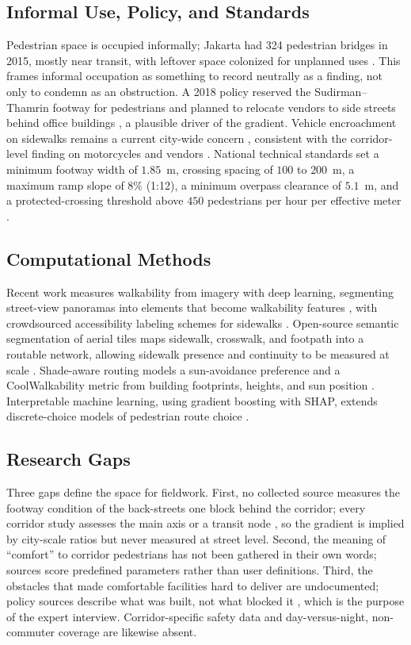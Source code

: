 \documentclass[conference]{IEEEtran}
\begin{document}
\subsection{Informal Use, Policy, and Standards}
Pedestrian space is occupied informally; Jakarta had 324 pedestrian bridges in 2015, mostly near
transit, with leftover space colonized for unplanned uses \autocite{putri2020residual}. This frames
informal occupation as something to record neutrally as a finding, not only to condemn as an
obstruction. A 2018 policy reserved the Sudirman--Thamrin footway for pedestrians and planned to
relocate vendors to side streets behind office buildings \autocite{merdeka2018pkl}, a plausible
driver of the gradient. Vehicle encroachment on sidewalks remains a current city-wide concern
\autocite{kompas2026trotoar}, consistent with the corridor-level finding on motorcycles and
vendors \autocite{dwisadana2024}. National technical standards set a minimum footway width of
$1.85$~m, crossing spacing of $100$ to $200$~m, a maximum ramp slope of $8\%$ (1:12), a minimum
overpass clearance of $5.1$~m, and a protected-crossing threshold above $450$ pedestrians per hour
per effective meter \autocite{binamarga2023}.

\subsection{Computational Methods}
Recent work measures walkability from imagery with deep learning, segmenting street-view panoramas
into elements that become walkability features \autocite{walkabilitydl2024}, with crowdsourced
accessibility labeling schemes for sidewalks \autocite{projectsidewalk2019}. Open-source semantic
segmentation of aerial tiles maps sidewalk, crosswalk, and footpath into a routable network,
allowing sidewalk presence and continuity to be measured at scale \autocite{tile2net2023}.
Shade-aware routing models a sun-avoidance preference and a CoolWalkability metric from building
footprints, heights, and sun position \autocite{coolwalks2025}. Interpretable machine learning,
using gradient boosting with SHAP, extends discrete-choice models of pedestrian route choice
\autocite{routechoiceml2024,afkara2020walking}.

\subsection{Research Gaps}
Three gaps define the space for fieldwork. First, no collected source measures the footway
condition of the back-streets one block behind the corridor; every corridor study assesses the
main axis or a transit node \autocite{dwisadana2024,rakhmatulloh2020,ridhani2015,mulyadi2022}, so
the gradient is implied by city-scale ratios but never measured at street level. Second, the
meaning of ``comfort'' to corridor pedestrians has not been gathered in their own words; sources
score predefined parameters rather than user definitions. Third, the obstacles that made
comfortable facilities hard to deliver are undocumented; policy sources describe what was built,
not what blocked it \autocite{beritajakarta2019,itdp2019}, which is the purpose of the expert
interview. Corridor-specific safety data and day-versus-night, non-commuter coverage are likewise
absent.
\end{document}
